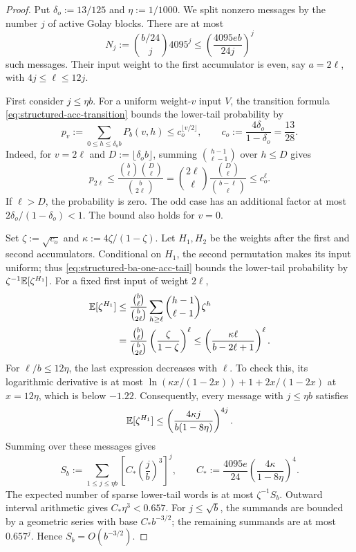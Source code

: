 \begin{proof}
Put $\delta_o:=13/125$ and $\eta:=1/1000$. We split nonzero messages
by the number $j$ of active Golay blocks. There are at most
\[
  N_j:=\binom{b/24}{j}4095^j
  \le\left(\frac{4095eb}{24j}\right)^j
\]
such messages. Their input weight to the first accumulator is even,
say $a=2\ell$, with $4j\le\ell\le12j$.

First consider $j\le\eta b$. For a uniform weight-$v$ input $V$,
the transition formula \eqref{eq:structured-acc-transition} bounds the
lower-tail probability by
\begin{equation}
  p_v:=\sum_{0\le h\le\delta_o b}P_b(v,h)
  \le c_o^{\lfloor v/2\rfloor},
  \qquad c_o:=\frac{4\delta_o}{1-\delta_o}=\frac{13}{28}.
  \label{eq:structured-ba-one-acc-tail}
\end{equation}
Indeed, for $v=2\ell$ and $D:=\lfloor\delta_o b\rfloor$, summing
$\binom{h-1}{\ell-1}$ over $h\le D$ gives
\[
  p_{2\ell}
  \le\frac{\binom b\ell\binom D\ell}{\binom b{2\ell}}
  =\binom{2\ell}{\ell}\frac{\binom D\ell}{\binom{b-\ell}\ell}
  \le c_o^\ell.
\]
If $\ell>D$, the probability is zero. The odd case has an additional
factor at most $2\delta_o/(1-\delta_o)<1$. The bound also holds for $v=0$.

Set $\zeta:=\sqrt{c_o}$ and $\kappa:=4\zeta/(1-\zeta)$.
Let $H_1,H_2$ be the weights after the first and second accumulators.
Conditional on $H_1$, the second permutation makes its input uniform;
thus \eqref{eq:structured-ba-one-acc-tail} bounds the lower-tail
probability by $\zeta^{-1}\mathbb E[\zeta^{H_1}]$.
For a fixed first input of weight $2\ell$,
\begin{equation}
\begin{split}
  \mathbb E[\zeta^{H_1}]
  &\le\frac{\binom b\ell}{\binom b{2\ell}}
      \sum_{h\ge\ell}\binom{h-1}{\ell-1}\zeta^h\\
  &=\frac{\binom b\ell}{\binom b{2\ell}}
      \left(\frac{\zeta}{1-\zeta}\right)^\ell
  \le\left(\frac{\kappa\ell}{b-2\ell+1}\right)^\ell.
\end{split}
\label{eq:structured-ba-sparse-moment}
\end{equation}
For $\ell/b\le12\eta$, the last expression decreases with $\ell$.
To check this, its logarithmic derivative is at most
$\ln(\kappa x/(1-2x))+1+2x/(1-2x)$ at $x=12\eta$,
which is below $-1.22$.
Consequently, every message with $j\le\eta b$ satisfies
\[
  \mathbb E[\zeta^{H_1}]
  \le\left(\frac{4\kappa j}{b(1-8\eta)}\right)^{4j}.
\]
Summing over these messages gives
\begin{equation}
  S_b:=\sum_{1\le j\le\eta b}
    \left[C_*\left(\frac jb\right)^3\right]^j,
  \qquad
  C_*:=\frac{4095e}{24}
       \left(\frac{4\kappa}{1-8\eta}\right)^4.
  \label{eq:structured-ba-sparse-sum}
\end{equation}
The expected number of sparse lower-tail words is at most
$\zeta^{-1}S_b$. Outward interval arithmetic gives
$C_*\eta^3<0.657$. For $j\le\sqrt b$, the summands are bounded by
a geometric series with base $C_*b^{-3/2}$; the remaining summands
are at most $0.657^j$. Hence $S_b=O(b^{-3/2})$.


\end{proof}
